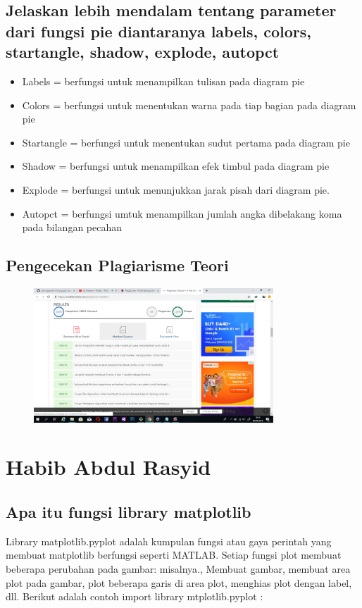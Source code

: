 \subsection{Jelaskan lebih mendalam tentang parameter dari fungsi pie diantaranya labels, colors, startangle, shadow, explode, autopct}
\begin{itemize}
    \item Labels = berfungsi untuk menampilkan tulisan pada diagram pie
    \item Colors = berfungsi untuk menentukan warna pada tiap bagian pada diagram pie
    \item Startangle = berfungsi untuk menentukan sudut pertama pada diagram pie
    \item Shadow = berfungsi untuk menampilkan efek timbul pada diagram pie
    \item Explode = berfungsi untuk menunjukkan jarak pisah dari diagram pie.
    \item Autopct = berfungsi umtuk menampilkan jumlah angka dibelakang koma pada bilangan pecahan
\end{itemize}

\subsection{Pengecekan Plagiarisme Teori}
\begin{figure}[H]
	\includegraphics[width=9cm]{figures/6/Teori/1174004/Plagiat.png}
	\centering
\end{figure}

\section{Habib Abdul Rasyid}
\subsection{ Apa itu fungsi library matplotlib}
Library matplotlib.pyplot adalah kumpulan fungsi atau gaya perintah yang membuat matplotlib berfungsi seperti MATLAB. Setiap fungsi plot membuat beberapa perubahan pada gambar: misalnya., Membuat gambar, membuat area plot pada gambar, plot beberapa garis di area plot, menghias plot dengan label, dll. Berikut adalah contoh import library mtplotlib.pyplot :

